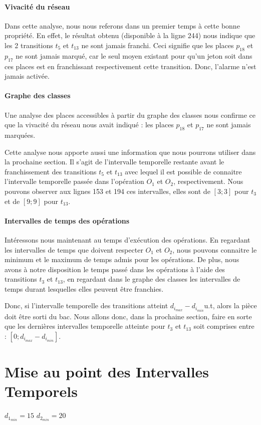 \paragraph*{Vivacité du réseau} Dans cette analyse, nous nous referons dans un premier temps à cette bonne propriété. En effet, le résultat obtenu (disponible à la ligne 244) nous indique que les 2 transitions $t_5$ et $t_{13}$ ne sont jamais franchi. Ceci signifie que les places $p_{18}$ et $p_{17}$ ne sont jamais marqué, car le seul moyen existant pour qu'un jeton soit dans ces places est en franchissant respectivement cette transition. Donc, l'alarme n'est jamais activée.

\paragraph*{Graphe des classes}Une analyse des places accessibles à partir du graphe des classes nous confirme ce que la vivacité du réseau nous avait indiqué : les places $p_{18}$ et $p_{17}$ ne sont jamais marquées. 

Cette analyse nous apporte aussi une information que nous pourrons utiliser dans la prochaine section. Il s'agit de l'intervalle temporelle restante avant le franchissement des transitions $t_5$ et $t_{13}$ avec lequel il est possible de connaitre l'intervalle temporelle passée dans l'opération $O_1$ et $O_2$, respectivement. Nous pouvons observer aux lignes 153 et 194 ces intervalles, elles sont de $[3;3]$ pour $t_3$ et de $[9;9]$ pour $t_{13}$. 

\paragraph*{Intervalles de temps des opérations} Intéressons nous maintenant au temps d'exécution des opérations. En regardant les intervalles de temps que doivent respecter $O_1$ et $O_2$, nous pouvons connaitre le minimum et le maximum de temps admis pour les opérations. De plus, nous avons à notre disposition le temps passé dans les opérations à l'aide des transitions $t_3$ et $t_{13}$, en regardant dans le graphe des classes les intervalles de temps durant lesquelles elles peuvent être franchies. 

Donc, si l'intervalle temporelle des transitions atteint $d_{i_{max}} - d_{i_{min}}$u.t, alors la pièce doit être sorti du bac. Nous allons donc, dans la prochaine section, faire en sorte que les dernières intervalles temporelle atteinte pour $t_3$ et $t_{13}$ soit comprises entre : $[0;d_{i_{max}} - d_{i_{min}}]$.




\section{Mise au point des Intervalles Temporels}
$d_{1_{min}} = 15$
$d_{2_{min}} = 20$